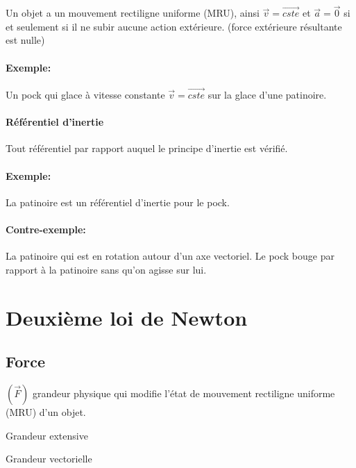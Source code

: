 \documentclass[
    11pt,
    a4paper,
    oneside,
    headinlcude, footinclude,
    twoside,
]{report}
\renewcommand{\vec}[1]{\overrightarrow{#1}}
\begin{document}
\begin{highlightBox}
    Un objet a un mouvement rectiligne uniforme (MRU), ainsi $\vec v = \vec{cste}$ et
    $\vec a = \vec 0$  si et seulement si il ne subir aucune action
    extérieure. (force extérieure résultante est nulle)
\end{highlightBox}

\paragraph{Exemple:}

Un pock qui glace à vitesse constante $\vec v = \vec{cste}$ sur la glace d'une
patinoire.

\paragraph{Référentiel d'inertie}

Tout référentiel par rapport auquel le principe d'inertie est vérifié.

\paragraph{Exemple:}

La patinoire est un référentiel d'inertie pour le pock.

\paragraph{Contre-exemple:}

La patinoire qui est en rotation autour d'un axe vectoriel. Le pock bouge par
rapport à la patinoire sans qu'on agisse sur lui.

\section{Deuxième loi de Newton}

\subsection{Force}

\begin{description}
    \item[Force] $(\vec F)$ grandeur physique qui modifie l'état de mouvement
        rectiligne uniforme (MRU) d'un objet.
    \item Grandeur extensive
    \item Grandeur vectorielle
\end{description}
\end{document}
